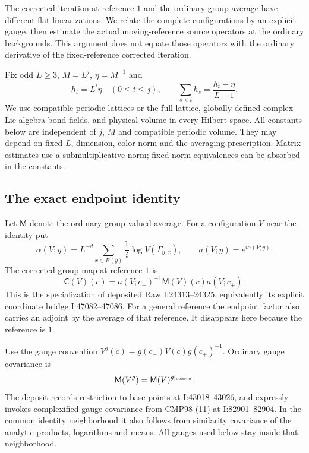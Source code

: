 \documentclass[11pt]{article}
\theoremstyle{remark}
\begin{document}
The corrected iteration at reference $1$ and the ordinary group
average have different flat linearizations. We relate the complete
configurations by an explicit gauge, then estimate the actual
moving-reference source operators at the ordinary backgrounds.
This argument does not equate those operators with the ordinary
derivative of the fixed-reference corrected iteration.

Fix odd $L\ge3$, $M=L^j$, $\eta=M^{-1}$ and
\begin{equation}\label{nb-scales}
 h_t=L^t\eta\quad(0\le t\le j),\qquad
 \sum_{s<t}h_s=\frac{h_t-\eta}{L-1}.
\end{equation}
We use compatible periodic lattices or the full lattice, globally
defined complex Lie-algebra bond fields, and physical volume in
every Hilbert space. All constants below are independent of $j$,
$M$ and compatible periodic volume. They may depend on fixed
$L$, dimension, color norm and the averaging prescription.
Matrix estimates use a submultiplicative norm; fixed norm
equivalences can be absorbed in the constants.

\subsection{The exact endpoint identity}
\label{nb-source}

Let $\mathsf M$ denote the ordinary group-valued average. For a
configuration $V$ near the identity put
\begin{equation}\label{nb-endpoint-map}
 \alpha(V;y)=L^{-d}\sum_{x\in B(y)}\frac1i
                      \log V(\Gamma_{y,x}),\qquad
 a(V;y)=e^{i\alpha(V;y)}.
\end{equation}
The corrected group map at reference $1$ is
\begin{equation}\label{nb-corrected-map}
 \mathsf C(V)(c)
   =a(V;c_-)^{-1}\mathsf M(V)(c)a(V;c_+).
\end{equation}
This is the specialization of deposited Raw I:24313--24325,
equivalently its explicit coordinate bridge I:47082--47086.
For a general reference the endpoint factor also carries an
adjoint by the average of that reference. It disappears here
because the reference is $1$.

Use the gauge convention
$V^g(c)=g(c_-)V(c)g(c_+)^{-1}$. Ordinary gauge covariance is
\begin{equation}\label{nb-gauge-covariance}
 \mathsf M(V^g)=\mathsf M(V)^{g|_{\rm coarse}}.
\end{equation}
The deposit records restriction to base points at
I:43018--43026, and expressly invokes complexified gauge
covariance from CMP98 (11) at I:82901--82904. In the common
identity neighborhood it also follows from similarity covariance
of the analytic products, logarithms and means. All gauges used
below stay inside that neighborhood.
\end{document}
